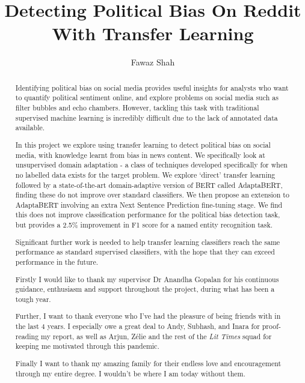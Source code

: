 \documentclass[a4paper, twoside]{report}
\title{Detecting Political Bias On Reddit With Transfer Learning}
\author{Fawaz Shah}
\begin{document}


\begin{abstract}

Identifying political bias on social media provides useful insights for analysts who want to quantify political sentiment online, and explore problems on social media such as filter bubbles and echo chambers. However, tackling this task with traditional supervised machine learning is incredibly difficult due to the lack of annotated data available.

In this project we explore using transfer learning to detect political bias on social media, with knowledge learnt from bias in news content. We specifically look at unsupervised domain adaptation - a class of techniques developed specifically for when no labelled data exists for the target problem. We explore `direct' transfer learning followed by a state-of-the-art domain-adaptive version of BERT called AdaptaBERT, finding these do not improve over standard classifiers. We then propose an extension to AdaptaBERT involving an extra Next Sentence Prediction fine-tuning stage. We find this does not improve classification performance for the political bias detection task, but provides a 2.5\% improvement in F1 score for a named entity recognition task.

Significant further work is needed to help transfer learning classifiers reach the same performance as standard supervised classifiers, with the hope that they can exceed performance in the future.

\end{abstract}

\renewcommand{\abstractname}{Acknowledgements}
\begin{abstract}

Firstly I would like to thank my supervisor Dr Anandha Gopalan for his continuous guidance, enthusiasm and support throughout the project, during what has been a tough year.

Further, I want to thank everyone who I've had the pleasure of being friends with in the last 4 years. I especially owe a great deal to Andy, Subhash, and Inara for proof-reading my report, as well as Arjun, Zélie and the rest of the \textit{Lit Times} squad for keeping me motivated through this pandemic.

Finally I want to thank my amazing family for their endless love and encouragement through my entire degree. I wouldn't be where I am today without them.

\end{abstract}

\tableofcontents
\listoffigures
\listoftables









\end{document}
